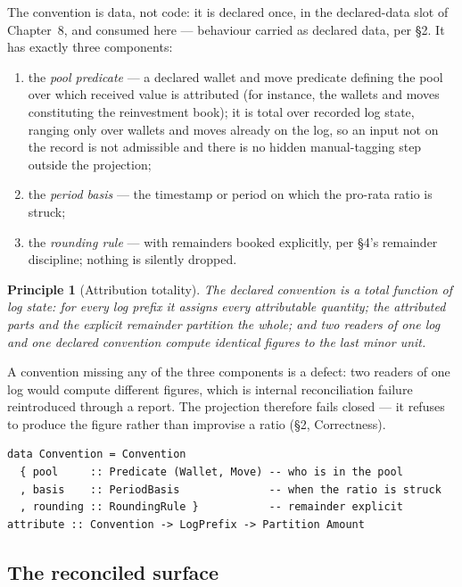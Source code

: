 \documentclass[11pt,a4paper]{article}
\newtheorem{principle}[definition]{Principle}
\begin{document}
The convention is data, not code: it is declared once, in the declared-data
slot of Chapter~8, and consumed here --- behaviour carried as declared data,
per \S 2. It has exactly three components:

\begin{enumerate}[nosep]
\item the \emph{pool predicate} --- a declared wallet and move predicate
  defining the pool over which received value is attributed (for instance, the
  wallets and moves constituting the reinvestment book); it is total over recorded
  log state, ranging only over wallets and moves already on the log, so an input not
  on the record is not admissible and there is no hidden manual-tagging step outside
  the projection;
\item the \emph{period basis} --- the timestamp or period on which the pro-rata
  ratio is struck;
\item the \emph{rounding rule} --- with remainders booked explicitly, per
  \S 4's remainder discipline; nothing is silently dropped.
\end{enumerate}

\begin{principle}[Attribution totality]\label{prin:attr-total}
The declared convention is a total function of log state: for every log prefix
it assigns every attributable quantity; the attributed parts and the explicit
remainder partition the whole; and two readers of one log and one declared
convention compute identical figures to the last minor unit.
\end{principle}

A convention missing any of the three components is a defect: two readers of
one log would compute different figures, which is internal reconciliation
failure reintroduced through a report. The projection therefore fails closed
--- it refuses to produce the figure rather than improvise a ratio (\S 2,
Correctness).

\begin{lstlisting}
data Convention = Convention
  { pool     :: Predicate (Wallet, Move) -- who is in the pool
  , basis    :: PeriodBasis              -- when the ratio is struck
  , rounding :: RoundingRule }           -- remainder explicit
attribute :: Convention -> LogPrefix -> Partition Amount
\end{lstlisting}

\subsection{The reconciled surface}
\end{document}
